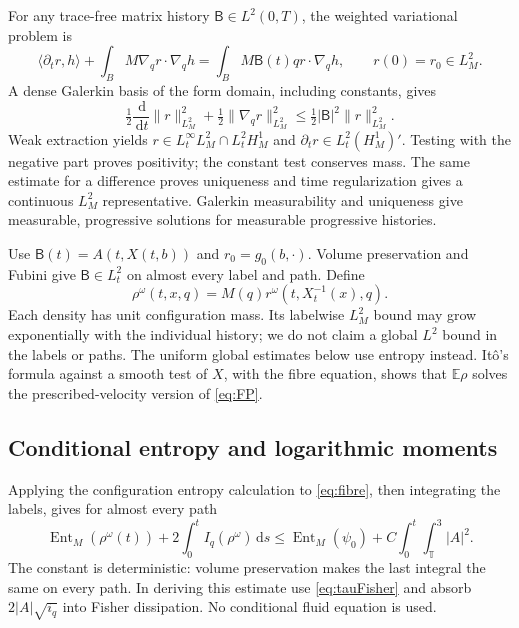 \documentclass[11pt]{article}
\numberwithin{equation}{section}
\newcommand{\T}{\mathbb T^3}
\newcommand{\E}{\mathbb E}
\newcommand{\dd}{\,\mathrm d}
\newcommand{\Ent}{\operatorname{Ent}_M}
\newcommand{\grad}{\nabla}
\newcommand{\pair}[1]{\langle #1\rangle}
\begin{document}
For any trace-free matrix history $\mathsf B\in L^2(0,T)$, the weighted variational
problem is
\begin{equation}\label{eq:fibre}
 \pair{\partial_tr,h}+\int_BM\grad_qr\cdot\grad_qh
   =\int_BM\mathsf B(t)qr\cdot\grad_qh,
 \qquad r(0)=r_0\in L^2_M.
\end{equation}
A dense Galerkin basis of the form domain, including constants, gives
\begin{equation}\label{eq:fibreenergy}
 \tfrac12\frac{\dd}{\dd t}\|r\|_{L^2_M}^2
 +\tfrac12\|\grad_qr\|_{L^2_M}^2
 \leq\tfrac12|\mathsf B|^2\|r\|_{L^2_M}^2.
\end{equation}
Weak extraction yields
$r\in L^\infty_tL^2_M\cap L^2_tH^1_M$ and
$\partial_tr\in L^2_t(H^1_M)'$. Testing with the negative part proves
positivity; the constant test conserves mass. The same estimate for a
difference proves uniqueness and time regularization gives a continuous
$L^2_M$ representative. Galerkin measurability and uniqueness give measurable,
progressive solutions for measurable progressive histories.

Use $\mathsf B(t)=A(t,X(t,b))$ and $r_0=g_0(b,\cdot)$. Volume preservation and Fubini
give $\mathsf B\in L^2_t$ on almost every label and path. Define
\begin{equation}\label{eq:rho}
 \rho^\omega(t,x,q)=M(q)r^\omega(t,X_t^{-1}(x),q).
\end{equation}
Each density has unit configuration mass. Its labelwise $L^2_M$ bound may
grow exponentially with the individual history; we do not claim a global
$L^2$ bound in the labels or paths. The uniform global estimates below use
entropy instead. It\^o's formula against a smooth test of $X$, with the fibre
equation, shows that $\E\rho$ solves the prescribed-velocity version of
\eqref{eq:FP}.

\subsection{Conditional entropy and logarithmic moments}\label{subsec:log}
Applying the configuration entropy calculation to \eqref{eq:fibre}, then
integrating the labels, gives for almost every path
\begin{equation}\label{eq:conditionalentropy}
 \Ent(\rho^\omega(t))+2\int_0^t I_q(\rho^\omega)\dd s
 \leq\Ent(\psi_0)+C\int_0^t\int_\T|A|^2.
\end{equation}
The constant is deterministic: volume preservation makes the last integral
the same on every path. In deriving this estimate use \eqref{eq:tauFisher}
and absorb $2|A|\sqrt{i_q}$ into Fisher dissipation. No conditional fluid
equation is used.
\end{document}

